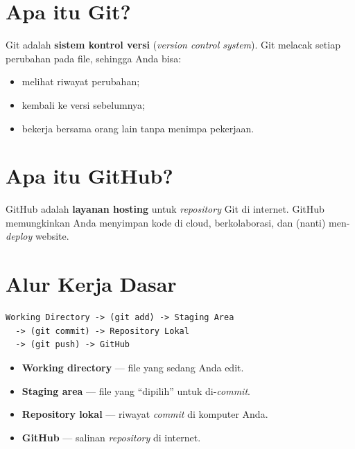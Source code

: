 \section{Apa itu Git?}
\label{sec:apa-itu-git}

Git adalah \textbf{sistem kontrol versi} (\emph{version control system}). Git melacak setiap perubahan pada file, sehingga Anda bisa:
\begin{itemize}
  \item melihat riwayat perubahan;
  \item kembali ke versi sebelumnya;
  \item bekerja bersama orang lain tanpa menimpa pekerjaan.
\end{itemize}

\section{Apa itu GitHub?}
\label{sec:apa-itu-github}

GitHub adalah \textbf{layanan hosting} untuk \emph{repository} Git di internet. GitHub memungkinkan Anda menyimpan kode di cloud, berkolaborasi, dan (nanti) men-\emph{deploy} website.

\section{Alur Kerja Dasar}
\label{sec:alur-kerja}

\begin{lstlisting}[caption={Alur kerja Git}, label={lst:alur-git}]
Working Directory -> (git add) -> Staging Area
  -> (git commit) -> Repository Lokal
  -> (git push) -> GitHub
\end{lstlisting}

\begin{itemize}
  \item \textbf{Working directory} --- file yang sedang Anda edit.
  \item \textbf{Staging area} --- file yang ``dipilih'' untuk di-\emph{commit}.
  \item \textbf{Repository lokal} --- riwayat \emph{commit} di komputer Anda.
  \item \textbf{GitHub} --- salinan \emph{repository} di internet.
\end{itemize}

